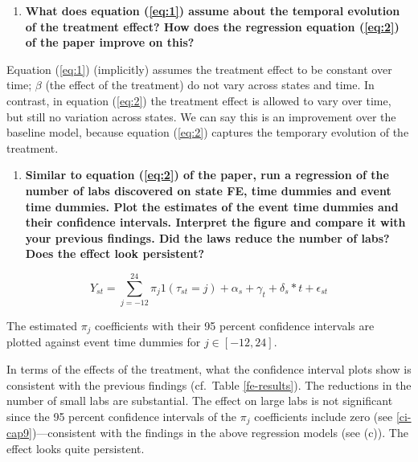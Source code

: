 \documentclass[
  11pt,
]{article}
\providecommand{\tightlist}{%
  \setlength{\itemsep}{0pt}\setlength{\parskip}{0pt}}
\begin{document}
\begin{enumerate}
\def\labelenumi{(\alph{enumi})}
\setcounter{enumi}{4}
\tightlist
\item
  \textbf{What does equation (\ref{eq:1}) assume about the temporal
  evolution of the treatment effect? How does the regression equation
  (\ref{eq:2}) of the paper improve on this?}
\end{enumerate}

Equation (\ref{eq:1}) (implicitly) assumes the treatment effect to be
constant over time; \(\beta\) (the effect of the treatment) do not vary
across states and time. In contrast, in equation (\ref{eq:2}) the
treatment effect is allowed to vary over time, but still no variation
across states. We can say this is an improvement over the baseline
model, because equation (\ref{eq:2}) captures the temporary evolution of
the treatment.

\begin{enumerate}
\def\labelenumi{(\alph{enumi})}
\setcounter{enumi}{5}
\tightlist
\item
  \textbf{Similar to equation (\ref{eq:2}) of the paper, run a
  regression of the number of labs discovered on state FE, time dummies
  and event time dummies. Plot the estimates of the event time dummies
  and their confidence intervals. Interpret the figure and compare it
  with your previous findings. Did the laws reduce the number of labs?
  Does the effect look persistent?}
\end{enumerate}

\begin{equation}
Y_{s t}=\sum_{j=-12}^{24} \pi_{j} 1\left(\tau_{s t}=j\right)+\alpha_{s}+\gamma_{t}+\delta_{s} * t+\epsilon_{s t}
\end{equation}

The estimated \(\pi_{j}\) coefficients with their 95 percent confidence
intervals are plotted against event time dummies for
\(j \in [-12, 24]\).

In terms of the effects of the treatment, what the confidence interval
plots show is consistent with the previous findings (cf.~Table
\ref{fe-results}). The reductions in the number of small labs are
substantial. The effect on large labs is not significant since the 95
percent confidence intervals of the \(\pi_j\) coefficients include zero
(see \ref{ci-cap9})---consistent with the findings in the above
regression models (see (c)). The effect looks quite persistent.
\end{document}
